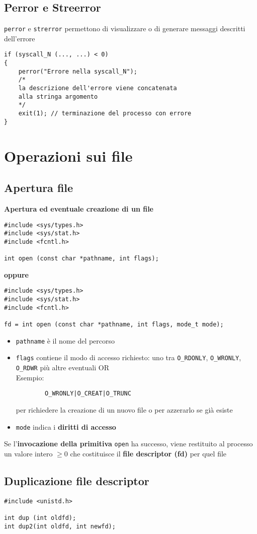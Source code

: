 \documentclass[italian,12pt,a4paper]{article}
\begin{document}
	\subsection{Perror e Streerror}
	\verb|perror| e \verb|strerror| permettono di visualizzare o di generare messaggi descritti dell'errore
	\begin{lstlisting}
if (syscall_N (..., ...) < 0)
{
	perror("Errore nella syscall_N");
	/*
	la descrizione dell'errore viene concatenata 
	alla stringa argomento
	*/
	exit(1); // terminazione del processo con errore	
}
	\end{lstlisting}
\section{Operazioni sui file}
\subsection{Apertura file}
\textbf{Apertura ed eventuale creazione di un file}
\begin{lstlisting}
#include <sys/types.h>
#include <sys/stat.h>
#include <fcntl.h>

int open (const char *pathname, int flags);
\end{lstlisting}
\textbf{oppure}
\begin{lstlisting}
#include <sys/types.h>
#include <sys/stat.h>
#include <fcntl.h>

fd = int open (const char *pathname, int flags, mode_t mode);
\end{lstlisting}
\begin{itemize}
	\item \verb|pathname| è il nome del percorso
	\item \verb|flags| contiene il modo di accesso richiesto: uno tra \verb|O_RDONLY|, \verb|O_WRONLY|, \verb|O_RDWR| più altre eventuali OR\\
	Esempio: 
	\begin{verbatim}
		O_WRONLY|O_CREAT|O_TRUNC
	\end{verbatim}
	per richiedere la creazione di un nuovo file o per azzerarlo se già esiste
	\item \verb|mode| indica i \textbf{diritti di accesso}
\end{itemize}
Se l'\textbf{invocazione della primitiva} \verb|open| ha successo, viene restituito al processo un valore intero $\geq 0$ che costituisce il \textbf{file descriptor (fd)} per quel file
\subsection{Duplicazione file descriptor}
\begin{lstlisting}
#include <unistd.h>

int dup (int oldfd);
int dup2(int oldfd, int newfd);
\end{lstlisting}
\end{document}
